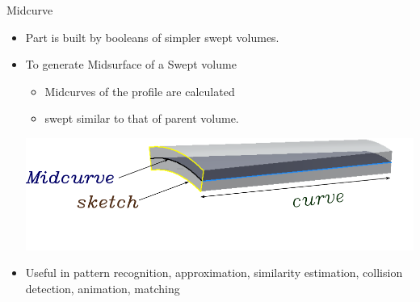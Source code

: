 
\begin{frame}{Midcurve}

\begin{itemize}[noitemsep,label=\textbullet,topsep=2pt,parsep=2pt,partopsep=2pt]
\item Part is built by booleans of simpler swept volumes.
\item To generate Midsurface of a Swept volume
	\begin{itemize}[noitemsep,label=\textbullet,topsep=2pt,parsep=2pt,partopsep=2pt]
	\item Midcurves of the profile are calculated 
	\item swept similar to that of parent volume.
	\end{itemize}
	\vskip 3mm
\includegraphics[width=0.85\linewidth]{../Common/images/MidsurfSmallProfile.pdf}
	\vskip -3mm
\item Useful in pattern recognition, approximation, similarity estimation, collision detection, animation, matching
\end{itemize}


\end{frame}


